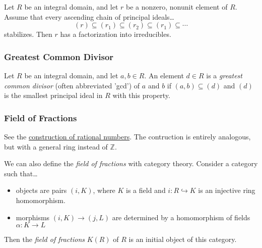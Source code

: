 \begin{proposition}
\label{acc}
Let $R$ be an integral domain, and let $r$ be a nonzero, nonunit element of $R$. Assume that every ascending chain of principal ideals\dots
$$(r) \subseteq (r_1) \subseteq (r_2) \subseteq (r_1) \subseteq \cdots$$
stabilizes. Then $r$ has a factorization into irreducibles.
\end{proposition}

\subsubsection{Greatest Common Divisor}\label{gcd}
Let $R$ be an integral domain, and let $a,b \in R$. An element $d \in R$ is a \emph{greatest common divisor} (often abbreviated 'gcd') of
$a$ and $b$ if $(a,b) \subseteq (d)$ and $(d)$ is the smallest principal ideal in $R$ with this property.

\subsubsection{Field of Fractions}\label{fieldoffractions}
See the \hyperref[rationals]{construction of rational numbers}. The contruction is entirely analogous, but with a general ring instead of $\mathbb{Z}$.\newline

\noindent We can also define the \emph{field of fractions} with category theory. Consider a category such that\dots
\begin{itemize}
  \item objects are pairs $(i, K)$, where $K$ is a field and $i : R \hookrightarrow K$ is an injective ring homomorphism.
  \item morphisms $(i,K) \rightarrow (j,L)$ are determined by a homomorphism of fields $\alpha : K \rightarrow L$
\end{itemize}
Then the \emph{field of fractions} $K(R)$ of $R$ is an initial object of this category.